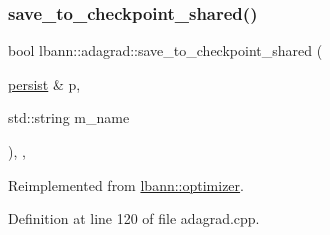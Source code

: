 \subsubsection{\texorpdfstring{save\+\_\+to\+\_\+checkpoint\+\_\+shared()}{save\_to\_checkpoint\_shared()}}
{\footnotesize\ttfamily bool lbann\+::adagrad\+::save\+\_\+to\+\_\+checkpoint\+\_\+shared (\begin{DoxyParamCaption}\item[{\hyperlink{classlbann_1_1persist}{persist} \&}]{p,  }\item[{std\+::string}]{m\+\_\+name }\end{DoxyParamCaption})\hspace{0.3cm}{\ttfamily [override]}, {\ttfamily [private]}, {\ttfamily [virtual]}}



Reimplemented from \hyperlink{classlbann_1_1optimizer_afed10c6d8c5bd922f95075abeff711ce}{lbann\+::optimizer}.



Definition at line 120 of file adagrad.\+cpp.


